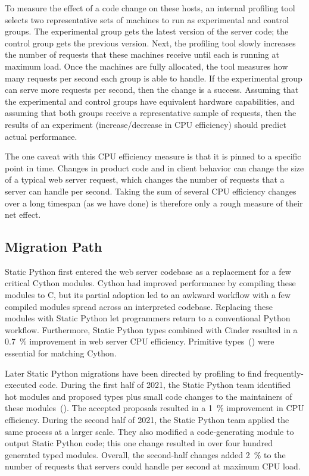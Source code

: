 \documentclass[english,cleveref,crc]{programming}
\newcommand{\SP}{Static Python}
\newcommand{\CPUchange}{\SI{3.7}{\percent}}
\begin{document}
To measure the effect of a code change on these hosts, an internal profiling tool selects
two representative sets of machines to run as experimental and control groups.
The experimental group gets the latest version of the server code;
the control group gets the previous version.
Next, the profiling tool slowly increases the number of requests that these
machines receive until each is running at maximum load.
Once the machines are fully allocated, the tool measures how many requests
per second each group is able to handle.
If the experimental group can serve more requests per second, then the change
is a success.
Assuming that the experimental and control groups have equivalent hardware
capabilities, and assuming that both groups receive a representative sample
of requests, then the results of an experiment (increase/decrease in CPU efficiency)
should predict actual performance.

The one caveat with this CPU efficiency measure is that it is pinned
to a specific point in time.
Changes in product code and in client behavior can change the size
of a typical web server request, which changes the number
of requests that a server can handle per second.
Taking the sum of several CPU efficiency changes over a long
timespan (as we have done) is therefore only a rough
measure of their net effect.


\subsection{Migration Path}
\label{s:migration-path}

\SP{} first entered the web server codebase as a replacement for a
few critical Cython modules.
Cython had improved performance by compiling these modules to C,
but its partial adoption led to an awkward workflow with a
few compiled modules spread across an interpreted codebase.
Replacing these modules with \SP{} let programmers return to a conventional
Python workflow.
Furthermore, \SP{} types combined with Cinder resulted in a
\SI{0.7}{\percent} improvement in web server CPU efficiency.
Primitive types~() were essential for matching Cython.

Later \SP{} migrations have been directed by profiling to find frequently-executed code.
During the first half of 2021, the \SP{} team identified hot
modules and proposed types plus small code changes to the maintainers of these modules~().
The accepted proposals resulted in a \SI{1}{\percent} improvement in CPU efficiency.
During the second half of 2021, the \SP{} team applied the same
process at a larger scale.
They also modified a code-generating module to output \SP{} code;
this one change resulted in over four hundred generated typed modules.
Overall, the second-half changes added \SI{2}{\percent} to the number of requests
that servers could handle per second at maximum CPU load.
\end{document}
